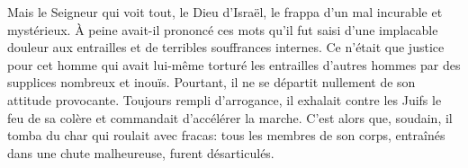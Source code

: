 Mais le Seigneur qui voit tout, le Dieu d’Israël,
	le frappa d’un mal incurable et mystérieux.
À peine avait-il prononcé ces mots qu’il fut saisi d’une implacable douleur aux entrailles
	et de terribles souffrances internes.
Ce n’était que justice pour cet homme
	qui avait lui-même torturé les entrailles d’autres hommes
		par des supplices nombreux et inouïs.
Pourtant, il ne se départit nullement de son attitude provocante.
Toujours rempli d’arrogance, il exhalait contre les Juifs le feu de sa colère
	et commandait d’accélérer la marche.
C’est alors que, soudain, il tomba du char qui roulait avec fracas:
	tous les membres de son corps, entraînés dans une chute malheureuse,
		furent désarticulés.
